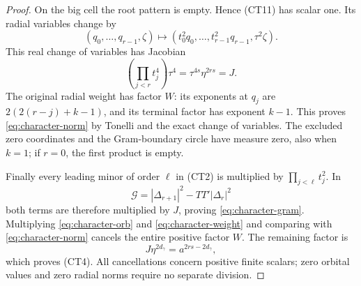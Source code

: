 \begin{proof}
On the big cell the root pattern is empty. Hence
(CT11) has scalar one. Its radial variables change by
\[
 (q_0,\ldots,q_{r-1},\zeta)
       \longmapsto
 (t_0^2q_0,\ldots,t_{r-1}^2q_{r-1},\tau^2\zeta).
                                                        \tag{CT14}
\]
This real change of variables has Jacobian
\[
       \left(\prod_{j<r}t_j^4\right)\tau^4
                    =\tau^{4s}\eta^{2rs}=J.
                                                        \tag{CT15}
\]
The original radial weight has factor \(W\):
its exponents at \(q_j\) are \(2(2(r-j)+k-1)\),
and its terminal factor has exponent \(k-1\).
This proves \eqref{eq:character-norm} by Tonelli and
the exact change of variables. The excluded zero
coordinates and the Gram-boundary circle have measure
zero, also when \(k=1\); if \(r=0\), the first product
is empty.

Finally every leading minor of order \(\ell\) in
(CT2) is multiplied by \(\prod_{j<\ell}t_j^2\).
In
\[
       \mathcal G=|\Delta_{r+1}|^2-TT'|\Delta_r|^2
\]
both terms are therefore multiplied by \(J\), proving
\eqref{eq:character-gram}. Multiplying
\eqref{eq:character-orb} and \eqref{eq:character-weight}
and comparing with \eqref{eq:character-norm} cancels
the entire positive factor \(W\). The remaining factor
is
\[
              J\eta^{2d_\gamma}=a^{2rs-2d_\gamma},
\]
which proves (CT4). All cancellations concern positive
finite scalars; zero orbital values and zero radial
norms require no separate division.
\end{proof}

